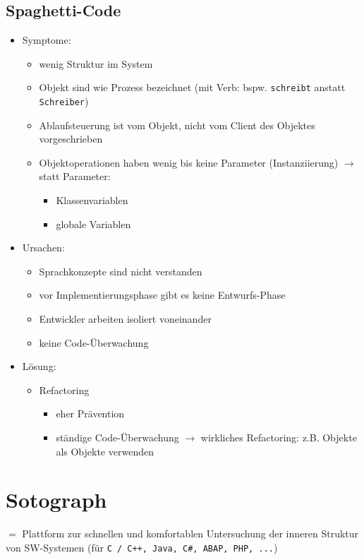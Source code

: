 \subsection{Spaghetti-Code}
\begin{itemize}
\item Symptome:
\begin{itemize}
\item wenig Struktur im System
\item Objekt sind wie Prozess bezeichnet (mit Verb: bspw. \texttt{schreibt} anstatt \texttt{Schreiber})
\item Ablaufsteuerung ist vom Objekt, nicht vom Client des Objektes vorgeschrieben
\item Objektoperationen haben wenig bis keine Parameter (Instanziierung) $\to$ statt Parameter: 
\begin{itemize}
\item Klassenvariablen
\item globale Variablen
\end{itemize}
\end{itemize}
\item Ursachen:
\begin{itemize}
\item Sprachkonzepte sind nicht verstanden
\item vor Implementierungsphase gibt es keine Entwurfs-Phase
\item Entwickler arbeiten isoliert voneinander
\item keine Code-Überwachung
\end{itemize}
\item Lösung:
\begin{itemize}
\item Refactoring
\begin{itemize}
\item eher Prävention
\item ständige Code-Überwachung $\to$ wirkliches Refactoring: z.B. Objekte als Objekte verwenden
\end{itemize}
\end{itemize}
\end{itemize}

\clearpage
\section{Sotograph}
$=$ Plattform zur schnellen und komfortablen Untersuchung der inneren Struktur von SW-Systemen (für \lstinline`C / C++, Java, C#, ABAP, PHP, ...`)


